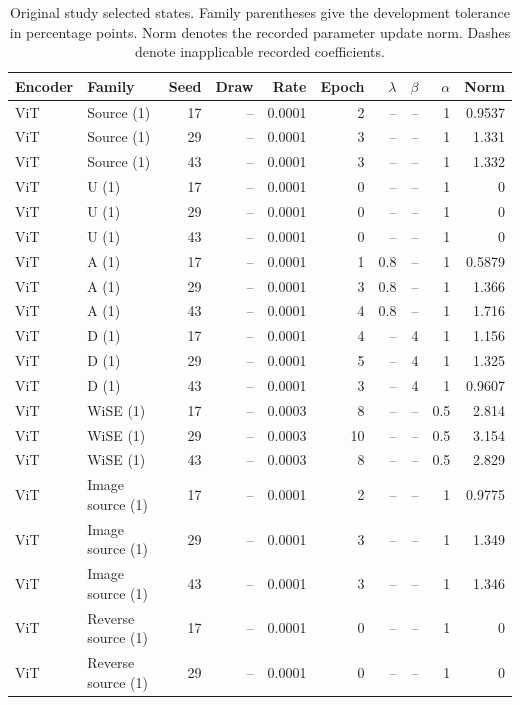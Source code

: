 \begin{table}[t]
\centering
\scriptsize
\setlength{\tabcolsep}{3pt}
\begin{tabular}{llrrrrrrrr}
\toprule
Encoder & Family & Seed & Draw & Rate & Epoch & $\lambda$ & $\beta$ & $\alpha$ & Norm\\
\midrule
ViT & Source (1) & 17 & -- & 0.0001 & 2 & -- & -- & 1 & 0.9537\\
ViT & Source (1) & 29 & -- & 0.0001 & 3 & -- & -- & 1 & 1.331\\
ViT & Source (1) & 43 & -- & 0.0001 & 3 & -- & -- & 1 & 1.332\\
ViT & U (1) & 17 & -- & 0.0001 & 0 & -- & -- & 1 & 0\\
ViT & U (1) & 29 & -- & 0.0001 & 0 & -- & -- & 1 & 0\\
ViT & U (1) & 43 & -- & 0.0001 & 0 & -- & -- & 1 & 0\\
ViT & A (1) & 17 & -- & 0.0001 & 1 & 0.8 & -- & 1 & 0.5879\\
ViT & A (1) & 29 & -- & 0.0001 & 3 & 0.8 & -- & 1 & 1.366\\
ViT & A (1) & 43 & -- & 0.0001 & 4 & 0.8 & -- & 1 & 1.716\\
ViT & D (1) & 17 & -- & 0.0001 & 4 & -- & 4 & 1 & 1.156\\
ViT & D (1) & 29 & -- & 0.0001 & 5 & -- & 4 & 1 & 1.325\\
ViT & D (1) & 43 & -- & 0.0001 & 3 & -- & 4 & 1 & 0.9607\\
ViT & WiSE (1) & 17 & -- & 0.0003 & 8 & -- & -- & 0.5 & 2.814\\
ViT & WiSE (1) & 29 & -- & 0.0003 & 10 & -- & -- & 0.5 & 3.154\\
ViT & WiSE (1) & 43 & -- & 0.0003 & 8 & -- & -- & 0.5 & 2.829\\
ViT & Image source (1) & 17 & -- & 0.0001 & 2 & -- & -- & 1 & 0.9775\\
ViT & Image source (1) & 29 & -- & 0.0001 & 3 & -- & -- & 1 & 1.349\\
ViT & Image source (1) & 43 & -- & 0.0001 & 3 & -- & -- & 1 & 1.346\\
ViT & Reverse source (1) & 17 & -- & 0.0001 & 0 & -- & -- & 1 & 0\\
ViT & Reverse source (1) & 29 & -- & 0.0001 & 0 & -- & -- & 1 & 0\\
\bottomrule
\end{tabular}
\caption{Original study selected states. Family parentheses give the development tolerance in percentage points. Norm denotes the recorded parameter update norm. Dashes denote inapplicable recorded coefficients.}\label{tab:originalselected0}
\end{table}


